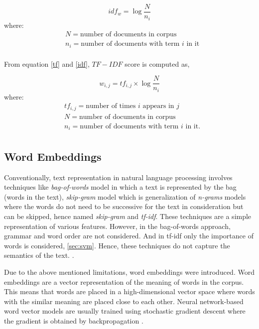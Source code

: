 \begin{equation}\label{idf}
idf_{w} = \log\frac{N}{n_{i}}
\end{equation}
where:
\begin{align*}
      & N=\text{number of documents in corpus}\\
      & n_{i}=\text{number of documents with term $i$ in it}\\
\end{align*}     

From equation \ref{tf} and \ref{idf}, $TF-IDF$ score is computed as,

\begin{equation}\label{tf-idf}
w_{i,j} = tf_{i,j} \times \log\frac{N}{n_{i}}
\end{equation}
where:
\begin{align*}
      & tf_{i,j}=\text{number of times $i$ appears in $j$}\\
      & N=\text{number of documents in corpus}\\
      & n_{i}=\text{number of documents with term $i$ in it.}\\
\end{align*}

\subsection{Word Embeddings}
Conventionally, text representation in natural language processing involves techniques like \textit{bag-of-words} model in which a text is represented by the bag (words in the text), \textit{skip-gram} model which is generalization of \textit{n-grams} models where the words do not need to be successive for the text in consideration but can be skipped, hence named \textit{skip-gram} \cite{guthrie2006closer} and  \textit{tf-idf}. These techniques are a simple representation of various features. However, in the bag-of-words approach, grammar and word order are not considered. And in tf-idf only the importance of words is considered, \ref{sec:svm}. Hence, these techniques do not capture the semantics of the text. \cite{maas2011learning}.

Due to the above mentioned limitations, word embeddings were introduced. Word embeddings are a vector representation of the meaning of words in the corpus. This means that words are placed in a high-dimensional vector space where words with the similar meaning are placed close to each other. Neural network-based word vector models are usually trained using stochastic gradient descent where the gradient is obtained by backpropagation \cite{le2014distributed}.

